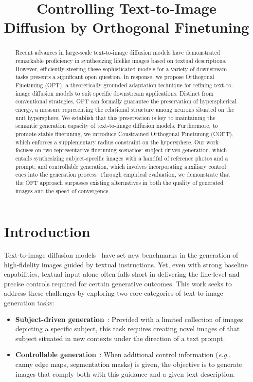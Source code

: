 \title{Controlling Text-to-Image Diffusion by Orthogonal Finetuning}

\begin{abstract}
Recent advances in large-scale text-to-image diffusion models have demonstrated remarkable proficiency in synthesizing lifelike images based on textual descriptions. However, efficiently steering these sophisticated models for a variety of downstream tasks presents a significant open question. In response, we propose Orthogonal Finetuning (OFT), a theoretically grounded adaptation technique for refining text-to-image diffusion models to suit specific downstream applications. Distinct from conventional strategies, OFT can formally guarantee the preservation of hyperspherical energy, a measure representing the relational structure among neurons situated on the unit hypersphere. We establish that this preservation is key to maintaining the semantic generation capacity of text-to-image diffusion models. Furthermore, to promote stable finetuning, we introduce Constrained Orthogonal Finetuning (COFT), which enforces a supplementary radius constraint on the hypersphere. Our work focuses on two representative finetuning scenarios: subject-driven generation, which entails synthesizing subject-specific images with a handful of reference photos and a prompt; and controllable generation, which involves incorporating auxiliary control cues into the generation process. Through empirical evaluation, we demonstrate that the OFT approach surpasses existing alternatives in both the quality of generated images and the speed of convergence.
\end{abstract}

\section{Introduction}

Text-to-image diffusion models~\cite{saharia2022photorealistic,ramesh2022hierarchical,rombach2022high} have set new benchmarks in the generation of high-fidelity images guided by textual instructions. Yet, even with strong baseline capabilities, textual input alone often falls short in delivering the fine-level and precise controls required for certain generative outcomes. This work seeks to address these challenges by exploring two core categories of text-to-image generation tasks:

\begin{itemize}[leftmargin=*,nosep]

    \item \textbf{Subject-driven generation}~\cite{ruiz2023dreambooth}: Provided with a limited collection of images depicting a specific subject, this task requires creating novel images of that subject situated in new contexts under the direction of a text prompt.
    \item \textbf{Controllable generation}~\cite{zhang2023adding,mou2023t2i}: When additional control information (\emph{e.g.}, canny edge maps, segmentation masks) is given, the objective is to generate images that comply both with this guidance and a given text description.
\end{itemize}

